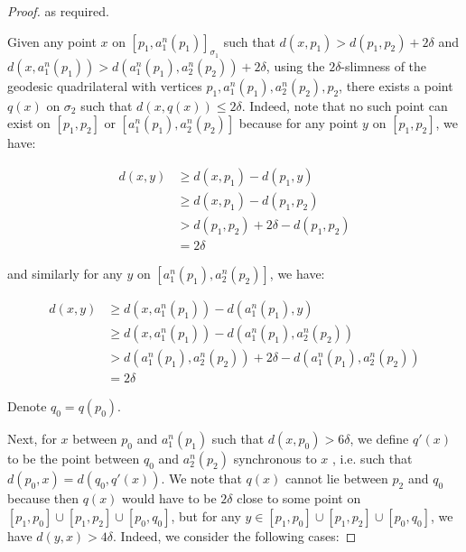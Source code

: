 \documentclass[12pt]{article}
\newcommand{\vs}{\vskip10pt}
\begin{document}
\begin{proof}
		as required.
		
		
		\vs 
		
		Given any point $x$ on $[p_1, a_1^n (p_1)]_{\sigma_1}$ such that $d(x, p_1) > d(p_1, p_2) + 2 \delta$ and $d(x, a_1^n (p_1)) > d(a_1^n (p_1), a_2^n (p_2)) + 2 \delta$, using the $2\delta$-slimness of the geodesic quadrilateral with vertices $p_1, a_1^n (p_1), a_2^n (p_2), p_2$, there exists a point $q(x)$ on $\sigma_2$ such that $d(x, q(x)) \leq 2 \delta$. Indeed, note that no such point can exist on $[p_1, p_2]$ or $[a_1^n (p_1), a_2^n (p_2)]$ because for any point $y$ on $[p_1, p_2]$, we have: 
		
		\begin{align*}
		d(x,y) &\geq d(x, p_1) - d(p_1, y) \\
		&\geq d(x, p_1) - d(p_1, p_2) \\
		&> d(p_1, p_2) + 2\delta - d(p_1, p_2) \\
		&= 2\delta
		\end{align*}
		
		and similarly for any $y$ on $[a_1^n (p_1), a_2^n (p_2)]$, we have: 
		
		\begin{align*}
		d(x, y) &\geq d(x, a_1^n (p_1)) - d(a_1^n (p_1), y) \\
		&\geq d(x, a_1^n (p_1)) - d(a_1^n (p_1), a_2^n (p_2)) \\
		&> d(a_1^n (p_1), a_2 ^n (p_2)) + 2\delta - d(a_1 ^n (p_1), a_2^n (p_2)) \\
		&= 2 \delta
		\end{align*}
		
		 Denote $q_0 = q(p_0)$. 
		
		\vs 
		
		Next, for $x$ between $p_0$ and $a_1^n (p_1)$ such that $d(x, p_0) > 6 \delta$, we define $q'(x)$ to be the point between $q_0$ and $a_2^n (p_2)$ synchronous to $x$ , i.e. such that $d(p_0, x) = d(q_0, q'(x))$. We note that $q(x)$ cannot lie between $p_2$ and $q_0$ because then $q(x)$ would have to be $2\delta$ close to some point on $[p_1,p_0] \cup [p_1, p_2] \cup [p_0, q_0]$, but for any $y \in [p_1,p_0] \cup [p_1, p_2] \cup [p_0, q_0]$, we have $d(y, x) > 4 \delta$. Indeed, we consider the following cases: 
		

\end{proof}
\end{document}

